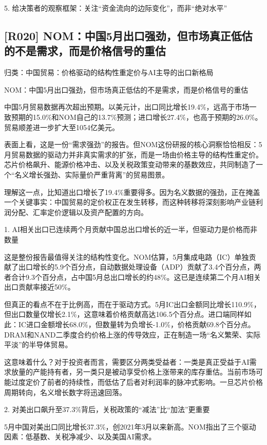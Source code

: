 \documentclass[11pt]{ctexart}
\begin{document}
5. 给决策者的观察框架：关注“资金流向的边际变化”，而非“绝对水平”

\subsection{[R020] NOM：中国5月出口强劲，但市场真正低估的不是需求，而是价格信号的重估}
{\small\color{refgray}归类：中国贸易：价格驱动的结构性重定价与AI主导的出口新格局}

NOM：中国5月出口强劲，但市场真正低估的不是需求，而是价格信号的重估

中国5月贸易数据再次超出预期。以美元计，出口同比增长19.4\%，远高于市场一致预期的15.0\%和NOM自己的13.7\%预测；进口增长27.4\%，也高于预期的26.0\%。贸易顺差进一步扩大至1054亿美元。

表面上看，这是一份“需求强劲”的报告。但NOM这份研报的核心洞察恰恰相反：5月贸易数据的驱动力并非真实需求的扩张，而是一场由价格主导的结构性重定价。 芯片价格飙升、能源价格冲击、以及关税政策变动带来的基数效应，共同制造了一个“名义增长强劲、实际量价严重背离”的贸易图景。

理解这一点，比知道出口增长了19.4\%重要得多。因为名义数据的强劲，正在掩盖一个关键事实：中国贸易的定价权正在发生转移，而这种转移将深刻影响产业链利润分配、汇率定价逻辑以及资产配置的方向。

1. AI相关出口已连续两个月贡献中国总出口增长的近一半，但驱动力是价格而非数量

这是整份报告最值得关注的结构性变化。NOM估算，5月集成电路（IC）单独贡献了出口增长的5.9个百分点，自动数据处理设备（ADP）贡献了3.4个百分点，两者合计9.3个百分点，占中国5月总出口增长的约48\%。这已是连续第二个月AI相关出口贡献率接近50\%。

但真正的看点不在于比例高，而在于驱动方式。5月IC出口金额同比增长110.9\%，但出口数量仅增长2.1\%，这意味着价格贡献高达106.5个百分点。进口端同样如此：IC进口金额增长68.0\%，但数量转为负增长-1.0\%，价格贡献69.8个百分点。DRAM和NAND二季度合约价格上涨的传导效应，正在制造一场“名义繁荣、实际平淡”的半导体贸易。

这意味着什么？对于投资者而言，需要区分两类受益者：一类是真正受益于AI需求放量的产能持有者，另一类只是被动享受价格上涨带来的库存重估。当前市场可能过度定价了前者的持续性，而低估了后者对利润率的脉冲式影响。一旦芯片价格周期转向，名义增长数字将迅速回落。

2. 对美出口飙升至37.3\%背后，关税政策的“减法”比“加法”更重要

5月中国对美出口同比增长37.3\%，创2021年3月以来新高。NOM指出了三个驱动因素：低基数、关税净减少、以及美国AI需求。
\end{document}
